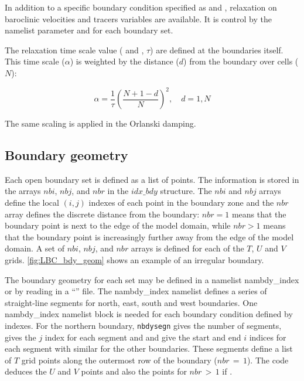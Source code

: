 \documentclass[../main/NEMO_manual]{subfiles}
\begin{document}
In addition to a specific boundary condition specified as  and , relaxation on baroclinic velocities and tracers variables are available.
It is control by the namelist parameter  and  for each boundary set.

The relaxation time scale value ( and , $\tau$) are defined at the boundaries itself.
This time scale ($\alpha$) is weighted by the distance ($d$) from the boundary over  cells ($N$):

\[
  \alpha = \frac{1}{\tau}(\frac{N+1-d}{N})^2,       \quad d=1,N
\]

The same scaling is applied in the Orlanski damping.

\subsection{Boundary geometry}
\label{subsec:LBC_bdy_geometry}

Each open boundary set is defined as a list of points.
The information is stored in the arrays $nbi$, $nbj$, and $nbr$ in the $idx\_bdy$ structure.
The $nbi$ and $nbj$ arrays define the local $(i,j)$ indexes of each point in the boundary zone and
the $nbr$ array defines the discrete distance from the boundary: $nbr=1$ means that
the boundary point is next to the edge of the model domain, while $nbr>1$ means that
the boundary point is increasingly further away from the edge of the model domain.
A set of $nbi$, $nbj$, and $nbr$ arrays is defined for each of the $T$, $U$ and $V$ grids.
\autoref{fig:LBC_bdy_geom} shows an example of an irregular boundary.

The boundary geometry for each set may be defined in a namelist nambdy\_index or
by reading in a ``'' file.
The nambdy\_index namelist defines a series of straight-line segments for north, east, south and west boundaries.
One nambdy\_index namelist block is needed for each boundary condition defined by indexes.
For the northern boundary, \texttt{nbdysegn} gives the number of segments,
 gives the $j$ index for each segment and  and
 give the start and end $i$ indices for each segment with similar for the other boundaries.
These segments define a list of $T$ grid points along the outermost row of the boundary ($nbr\,=\, 1$).
The code deduces the $U$ and $V$ points and also the points for $nbr\,>\, 1$ if .
\end{document}
